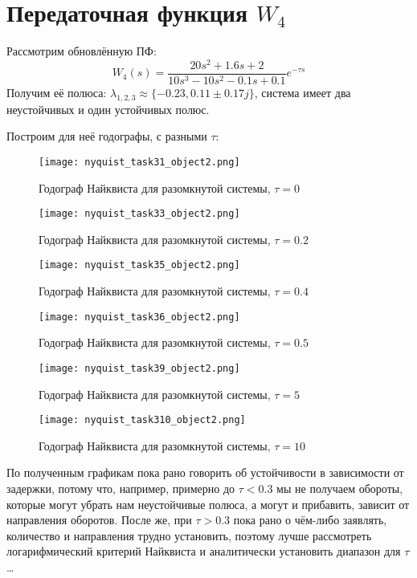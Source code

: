 \section{Передаточная функция $W_4$}
Рассмотрим обновлённую ПФ:
$$
    W_4(s) = \frac{20s^2 +1.6s +2}{10s^3-10s^2-0.1s+0.1}e^{-\tau s}
$$
Получим её полюса: $\lambda_{1,2,3} \approx \{-0.23, 0.11 \pm 0.17j \}$, система имеет два неустойчивых и один устойчивых полюс.

Построим для неё годографы, с разными $\tau$:
\begin{figure}[ht]
    \centering
    \texttt{[image: nyquist\_task31\_object2.png]}
    \caption{Годограф Найквиста для разомкнутой системы, $\tau=0$}
\end{figure}
\newpage
\begin{figure}[ht]
    \centering
    \texttt{[image: nyquist\_task33\_object2.png]}
    \caption{Годограф Найквиста для разомкнутой системы, $\tau=0.2$}
\end{figure}

\begin{figure}[ht]
    \centering
    \texttt{[image: nyquist\_task35\_object2.png]}
    \caption{Годограф Найквиста для разомкнутой системы, $\tau=0.4$}
\end{figure}
\newpage
\begin{figure}[ht]
    \centering
    \texttt{[image: nyquist\_task36\_object2.png]}
    \caption{Годограф Найквиста для разомкнутой системы, $\tau=0.5$}
\end{figure}
\begin{figure}[ht]
    \centering
    \texttt{[image: nyquist\_task39\_object2.png]}
    \caption{Годограф Найквиста для разомкнутой системы, $\tau=5$}
\end{figure}
\newpage
\begin{figure}[ht]
    \centering
    \texttt{[image: nyquist\_task310\_object2.png]}
    \caption{Годограф Найквиста для разомкнутой системы, $\tau=10$}
\end{figure}
По полученным графикам пока рано говорить об устойчивости в зависимости от задержки, потому что, например, примерно до $\tau< 0.3$ мы не получаем обороты, которые могут убрать нам неустойчивые полюса, а могут и прибавить, зависит от направления оборотов.
После же, при $\tau > 0.3$ пока рано о чём-либо заявлять, количество и направления трудно установить, поэтому лучше рассмотреть логарифмический критерий Найквиста и аналитически установить диапазон для $\tau$\dots

